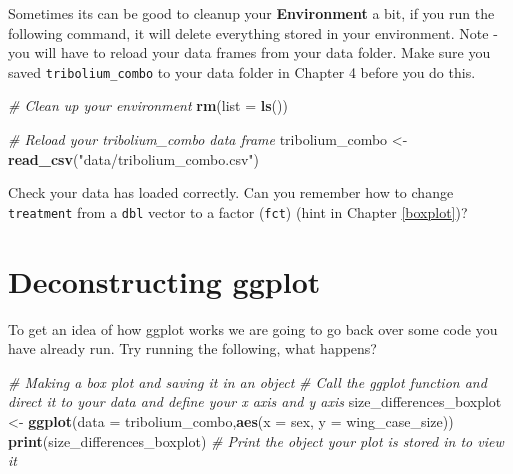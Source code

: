 \documentclass[
]{book}
\newenvironment{Shaded}{\begin{snugshade}}{\end{snugshade}}
\newcommand{\AttributeTok}[1]{\textcolor[rgb]{0.13,0.29,0.53}{#1}}
\newcommand{\CommentTok}[1]{\textcolor[rgb]{0.56,0.35,0.01}{\textit{#1}}}
\newcommand{\FunctionTok}[1]{\textcolor[rgb]{0.13,0.29,0.53}{\textbf{#1}}}
\newcommand{\NormalTok}[1]{#1}
\newcommand{\OtherTok}[1]{\textcolor[rgb]{0.56,0.35,0.01}{#1}}
\newcommand{\StringTok}[1]{\textcolor[rgb]{0.31,0.60,0.02}{#1}}
\begin{document}
Sometimes its can be good to cleanup your \textbf{Environment} a bit, if you run the following command, it will delete everything stored in your environment. Note - you will have to reload your data frames from your data folder. Make sure you saved \texttt{tribolium\_combo} to your data folder in Chapter 4 before you do this.

\begin{Shaded}
\begin{Highlighting}[]
\CommentTok{\# Clean up your environment}
\FunctionTok{rm}\NormalTok{(}\AttributeTok{list =} \FunctionTok{ls}\NormalTok{())}
\end{Highlighting}
\end{Shaded}

\begin{Shaded}
\begin{Highlighting}[]
\CommentTok{\# Reload your tribolium\_combo data frame}
\NormalTok{tribolium\_combo }\OtherTok{\textless{}{-}} \FunctionTok{read\_csv}\NormalTok{(}\StringTok{"data/tribolium\_combo.csv"}\NormalTok{)}
\end{Highlighting}
\end{Shaded}

Check your data has loaded correctly. Can you remember how to change \texttt{treatment} from a \texttt{dbl} vector to a factor (\texttt{fct}) (hint in Chapter \ref{boxplot})?

\section{Deconstructing ggplot}\label{deconstructing-ggplot}

To get an idea of how ggplot works we are going to go back over some code you have already run. Try running the following, what happens?

\begin{Shaded}
\begin{Highlighting}[]
\CommentTok{\# Making a box plot and saving it in an object}
\CommentTok{\# Call the ggplot function and direct it to your data and define your x axis and y axis}
\NormalTok{size\_differences\_boxplot }\OtherTok{\textless{}{-}} \FunctionTok{ggplot}\NormalTok{(}\AttributeTok{data =}\NormalTok{ tribolium\_combo,}\FunctionTok{aes}\NormalTok{(}\AttributeTok{x =}\NormalTok{ sex, }\AttributeTok{y =}\NormalTok{ wing\_case\_size)) }
\FunctionTok{print}\NormalTok{(size\_differences\_boxplot) }\CommentTok{\# Print the object your plot is stored in to view it}
\end{Highlighting}
\end{Shaded}
\end{document}
